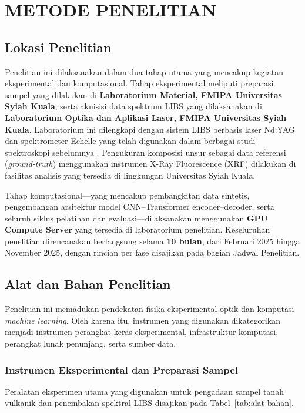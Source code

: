 \documentclass[12pt, a4paper]{article}
\begin{document}
\newpage

\section{METODE PENELITIAN}

\subsection{Lokasi Penelitian}

Penelitian ini dilaksanakan dalam dua tahap utama yang mencakup kegiatan eksperimental dan komputasional. Tahap eksperimental meliputi preparasi sampel yang dilakukan di \textbf{Laboratorium Material, FMIPA Universitas Syiah Kuala}, serta akuisisi data spektrum LIBS yang dilaksanakan di \textbf{Laboratorium Optika dan Aplikasi Laser, FMIPA Universitas Syiah Kuala}. Laboratorium ini dilengkapi dengan sistem LIBS berbasis laser Nd:YAG dan spektrometer Echelle yang telah digunakan dalam berbagai studi spektroskopi sebelumnya \citep{mitaphonna_characteristics_2023, mitaphonna_pulsed_2024, khumaeni_analysis_2025}. Pengukuran komposisi unsur sebagai data referensi (\textit{ground-truth}) menggunakan instrumen X-Ray Fluorescence (XRF) dilakukan di fasilitas analisis yang tersedia di lingkungan Universitas Syiah Kuala.

Tahap komputasional---yang mencakup pembangkitan data sintetis, pengembangan arsitektur model CNN--Transformer encoder--decoder, serta seluruh siklus pelatihan dan evaluasi---dilaksanakan menggunakan \textbf{GPU Compute Server} yang tersedia di laboratorium penelitian. Keseluruhan penelitian direncanakan berlangsung selama \textbf{10 bulan}, dari Februari 2025 hingga November 2025, dengan rincian per fase disajikan pada bagian Jadwal Penelitian.


\subsection{Alat dan Bahan Penelitian}

Penelitian ini memadukan pendekatan fisika eksperimental optik dan komputasi \textit{machine learning}. Oleh karena itu, instrumen yang digunakan dikategorikan menjadi instrumen perangkat keras eksperimental, infrastruktur komputasi, perangkat lunak penunjang, serta sumber data.

\subsubsection{Instrumen Eksperimental dan Preparasi Sampel}
Peralatan eksperimen utama yang digunakan untuk pengadaan sampel tanah vulkanik dan penembakan spektral LIBS disajikan pada Tabel~\ref{tab:alat-bahan}.
\end{document}
